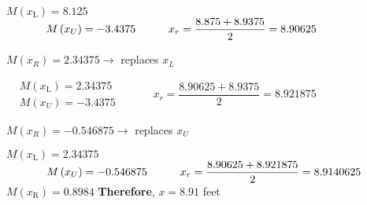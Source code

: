 \documentclass[../main.tex]{subfiles}
\begin{document}
$M\left(x_{\mathrm{L}}\right)=8.125$\\
$\hspace*{1.25cm}M\left(x_{U}\right)=-3.4375 \quad\quad\quad x_{r}=\dfrac{8.875+8.9375}{2}=8.90625$

$M\left(x_{R}\right)=2.34375 \rightarrow$ replaces $x_{L}$
\bigbreak

$\begin{aligned}&M\left(x_{\mathrm{L}}\right)=2.34375 \\&M\left(x_{U}\right)=-3.4375\end{aligned} \quad\quad\quad x_{r}=\dfrac{8.90625+8.9375}{2}=8.921875$

$M\left(x_{R}\right)=-0.546875 \rightarrow$ replaces $x_{U}$
\bigbreak

$M\left(x_{\mathrm{L}}\right)=2.34375$\\
	$\hspace*{1.25cm}M\left(x_{U}\right)=-0.546875 \quad\quad\quad x_{r}=\dfrac{8.90625+8.921875}{2}=8.9140625$
\bigbreak
$M\left(x_{\mathrm{R}}\right)=0.8984$ \textbf{Therefore}, $x=8.91$ feet
 \bigbreak
 
 
\end{document}
